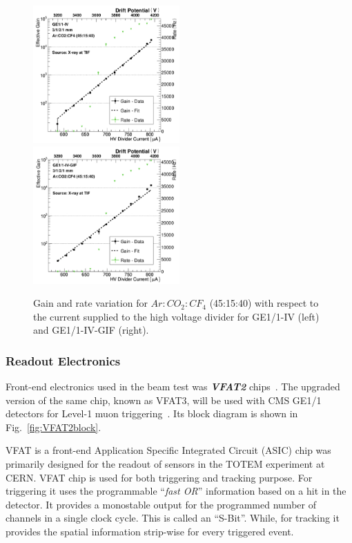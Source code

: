 \begin{figure}[htbp]
    \centering
    \includegraphics[width=0.5\textwidth]{figures/GEM/Gain_curve_GE11_IV_Ar_CO2_CF4.jpeg}%
    \includegraphics[width=0.5\textwidth]{figures/GEM/Gain_curve_GE11_IV_GIF_Ar_CO2_CF4.jpeg}
    \caption{Gain and rate variation for $Ar:CO_2:CF_4$ (45:15:40) with respect to the current supplied to the high voltage divider for GE1/1-IV (left) and GE1/1-IV-GIF (right).}
    \label{fig:gain_GE1/1_IV_GIF}
\end{figure}

\subsubsection{Readout Electronics} %
\label{ssub:readout_electronics}
Front-end electronics used in the beam test was \textbf{\textit{VFAT2}} chips~\cite{Aspell2007,Berardi2004}.
The upgraded version of the same chip, known as VFAT3, will be used with CMS GE1/1 detectors for Level-1 muon triggering~\cite{Licciulli2017}. Its block diagram is shown in Fig.~\ref{fig:VFAT2block}.

VFAT is a front-end Application Specific Integrated Circuit (ASIC) chip was primarily designed for the readout of sensors in the TOTEM experiment at CERN. 
VFAT chip is used for both triggering and tracking purpose.
For triggering it uses the programmable ``\textit{fast OR}'' information based on a hit in the detector.
It provides a monostable output for the programmed number of channels in a single clock cycle. 
This is called an ``S-Bit''. While, for tracking it provides the spatial information strip-wise for every triggered event.

